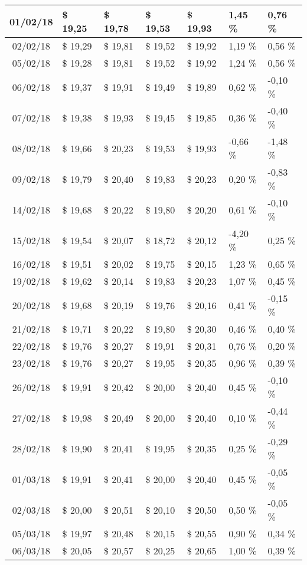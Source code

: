 \begin{center}
\begin{longtable}{|c|p{1.5cm}|p{1.5cm}|p{1.5cm}|p{1.5cm}|p{1.5cm}|p{1.5cm}|}
01/02/18 & \$ 19,25 & \$ 19,78 & \$ 19,53 & \$ 19,93 & 1,45 \% & 0,76 \% \\ \hline
02/02/18 & \$ 19,29 & \$ 19,81 & \$ 19,52 & \$ 19,92 & 1,19 \% & 0,56 \% \\ \hline
05/02/18 & \$ 19,28 & \$ 19,81 & \$ 19,52 & \$ 19,92 & 1,24 \% & 0,56 \% \\ \hline
06/02/18 & \$ 19,37 & \$ 19,91 & \$ 19,49 & \$ 19,89 & 0,62 \% & -0,10 \% \\ \hline
07/02/18 & \$ 19,38 & \$ 19,93 & \$ 19,45 & \$ 19,85 & 0,36 \% & -0,40 \% \\ \hline
08/02/18 & \$ 19,66 & \$ 20,23 & \$ 19,53 & \$ 19,93 & -0,66 \% & -1,48 \% \\ \hline
09/02/18 & \$ 19,79 & \$ 20,40 & \$ 19,83 & \$ 20,23 & 0,20 \% & -0,83 \% \\ \hline
14/02/18 & \$ 19,68 & \$ 20,22 & \$ 19,80 & \$ 20,20 & 0,61 \% & -0,10 \% \\ \hline
15/02/18 & \$ 19,54 & \$ 20,07 & \$ 18,72 & \$ 20,12 & -4,20 \% & 0,25 \% \\ \hline
16/02/18 & \$ 19,51 & \$ 20,02 & \$ 19,75 & \$ 20,15 & 1,23 \% & 0,65 \% \\ \hline
19/02/18 & \$ 19,62 & \$ 20,14 & \$ 19,83 & \$ 20,23 & 1,07 \% & 0,45 \% \\ \hline
20/02/18 & \$ 19,68 & \$ 20,19 & \$ 19,76 & \$ 20,16 & 0,41 \% & -0,15 \% \\ \hline
21/02/18 & \$ 19,71 & \$ 20,22 & \$ 19,80 & \$ 20,30 & 0,46 \% & 0,40 \% \\ \hline
22/02/18 & \$ 19,76 & \$ 20,27 & \$ 19,91 & \$ 20,31 & 0,76 \% & 0,20 \% \\ \hline
23/02/18 & \$ 19,76 & \$ 20,27 & \$ 19,95 & \$ 20,35 & 0,96 \% & 0,39 \% \\ \hline
26/02/18 & \$ 19,91 & \$ 20,42 & \$ 20,00 & \$ 20,40 & 0,45 \% & -0,10 \% \\ \hline
27/02/18 & \$ 19,98 & \$ 20,49 & \$ 20,00 & \$ 20,40 & 0,10 \% & -0,44 \% \\ \hline
28/02/18 & \$ 19,90 & \$ 20,41 & \$ 19,95 & \$ 20,35 & 0,25 \% & -0,29 \% \\ \hline
01/03/18 & \$ 19,91 & \$ 20,41 & \$ 20,00 & \$ 20,40 & 0,45 \% & -0,05 \% \\ \hline
02/03/18 & \$ 20,00 & \$ 20,51 & \$ 20,10 & \$ 20,50 & 0,50 \% & -0,05 \% \\ \hline
05/03/18 & \$ 19,97 & \$ 20,48 & \$ 20,15 & \$ 20,55 & 0,90 \% & 0,34 \% \\ \hline
06/03/18 & \$ 20,05 & \$ 20,57 & \$ 20,25 & \$ 20,65 & 1,00 \% & 0,39 \% \\ \hline

\end{longtable}
\end{center}
